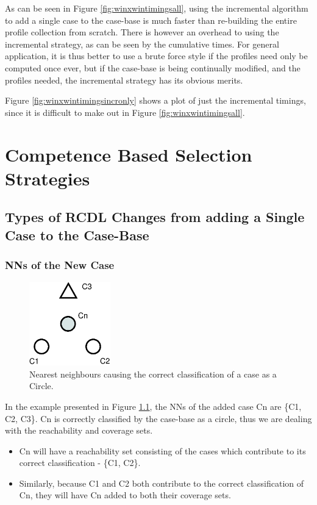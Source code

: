 \documentclass[a4paper,11pt]{report}
\begin{document}
\begin{samepage}
As can be seen in Figure \ref{fig:winxwintimingsall}, using the incremental algorithm to add a single case to the case-base is much faster than re-building the entire profile collection from scratch. There is however an overhead to using the incremental strategy, as can be seen by the cumulative times. For general application, it is thus better to use a brute force style if the profiles need only be computed once ever, but if the case-base is being continually modified, and the profiles needed, the incremental strategy has its obvious merits.

Figure \ref{fig:winxwintimingsincronly} shows a plot of just the incremental timings, since it is difficult to make out in Figure \ref{fig:winxwintimingsall}.
\end{samepage}


\chapter{Competence Based Selection Strategies\label{cha:compbasedselstrategies}}
\section{Types of RCDL Changes from adding a Single Case to the Case-Base}
\subsection{NNs of the New Case}
\begin{figure}[h!] 
\centering
	\includegraphics[width=100pt]{./Drawn/NNsCorrectlyClassify}
\caption{Nearest neighbours causing the correct classification of a case as a Circle.}
\label{fig:NNsCorrect}
\end{figure}

In the example presented in Figure \ref{fig:NNsCorrect}, the NNs of the added case Cn are \{C1, C2, C3\}. Cn is correctly classified by the case-base as a circle, thus we are dealing with the reachability and coverage sets.
\begin{itemize}
	\item Cn will have a reachability set consisting of the cases which contribute to its correct classification - \{C1, C2\}.
	\item Similarly, because C1 and C2 both contribute to the correct classification of Cn, they will have Cn added to both their coverage sets.
\end{itemize}
\end{document}
